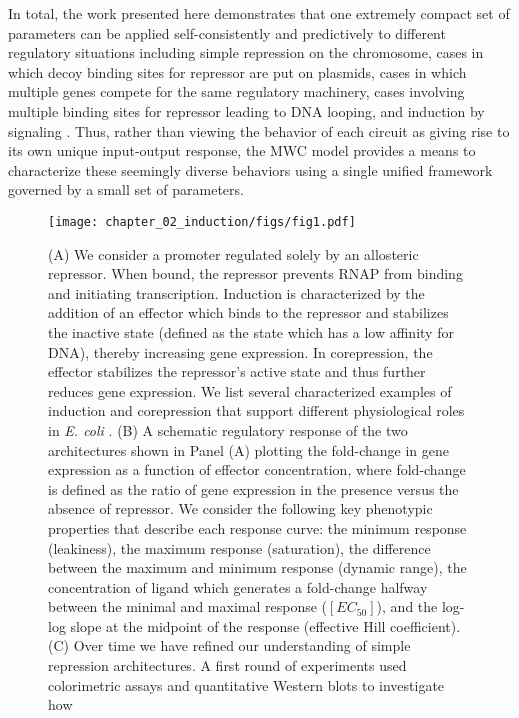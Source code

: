 In total, the work presented here demonstrates that one extremely compact set
of parameters can be applied self-consistently and predictively to different
regulatory situations including simple repression on the chromosome, cases in
which decoy binding sites for repressor are put on plasmids, cases in which
multiple genes compete for the same regulatory machinery, cases involving
multiple binding sites for repressor leading to DNA looping, and induction by
signaling
\cite{Garcia2011,Garcia2011B,Brewster2012,Boedicker2013a,Boedicker2013b,Brewster2014}.
Thus, rather than viewing the behavior of each circuit as giving rise to its
own unique input-output response, the MWC model provides a means to
characterize these seemingly diverse behaviors using a single unified
framework governed by a small set of parameters.


\begin{figure}[h!]
	\centering \texttt{[image: chapter\_02\_induction/figs/fig1.pdf]}
	\caption[Transcription regulation architectures involving an allosteric
	repressor.]{(A) We consider a promoter regulated solely by an
	allosteric repressor. When bound, the repressor prevents RNAP from binding and
	initiating transcription. Induction is characterized by the addition of an
	effector which binds to the repressor and stabilizes the inactive state
	(defined as the state which has a low affinity for DNA), thereby increasing
	gene expression. In corepression, the effector stabilizes the repressor's
	active state and thus further reduces gene expression. We list several
	characterized examples of induction and corepression that support different
	physiological roles in \textit{E. coli} \cite{Huang2011,Li2014}. (B)
	A schematic regulatory response of the two architectures shown in Panel
	(A) plotting the fold-change in gene expression as a function of
	effector concentration, where fold-change is defined as the ratio of gene
	expression in the presence versus the absence of repressor. We consider the
	following key phenotypic properties that describe each response curve: the
	minimum response (leakiness), the maximum response (saturation), the difference
	between the maximum and minimum response (dynamic range), the concentration of
	ligand which generates a fold-change halfway between the minimal and maximal
	response ($[EC_{50}]$), and the log-log slope at the midpoint of the response
	(effective Hill coefficient). (C) Over time we have refined our understanding
	of simple repression architectures. A first round of experiments used
	colorimetric assays and quantitative Western blots to investigate how
}
\end{figure}
